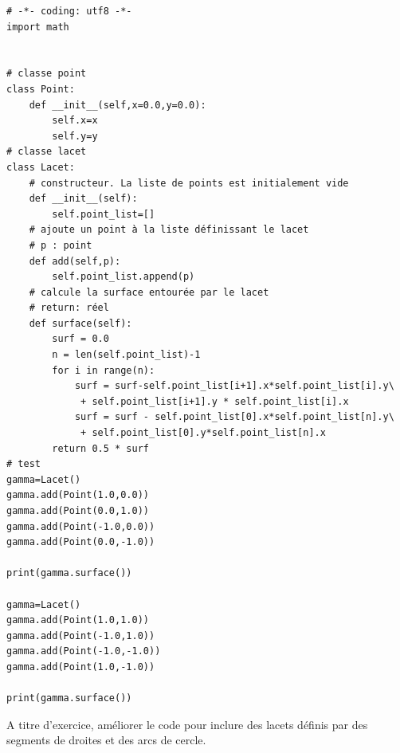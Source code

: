 \begin{verbatim}
# -*- coding: utf8 -*-
import math


# classe point
class Point:
    def __init__(self,x=0.0,y=0.0):
        self.x=x
        self.y=y
# classe lacet
class Lacet:
    # constructeur. La liste de points est initialement vide
    def __init__(self):
        self.point_list=[]
    # ajoute un point à la liste définissant le lacet
    # p : point
    def add(self,p):
        self.point_list.append(p)
    # calcule la surface entourée par le lacet
    # return: réel
    def surface(self):
        surf = 0.0
        n = len(self.point_list)-1
        for i in range(n):
            surf = surf-self.point_list[i+1].x*self.point_list[i].y\
             + self.point_list[i+1].y * self.point_list[i].x
        	surf = surf - self.point_list[0].x*self.point_list[n].y\
        	 + self.point_list[0].y*self.point_list[n].x
        return 0.5 * surf
# test
gamma=Lacet()
gamma.add(Point(1.0,0.0))
gamma.add(Point(0.0,1.0))
gamma.add(Point(-1.0,0.0))
gamma.add(Point(0.0,-1.0))

print(gamma.surface())

gamma=Lacet()
gamma.add(Point(1.0,1.0))
gamma.add(Point(-1.0,1.0))
gamma.add(Point(-1.0,-1.0))
gamma.add(Point(1.0,-1.0))

print(gamma.surface())
\end{verbatim}
A titre d'exercice, améliorer le code pour inclure des lacets définis par des segments de droites et des arcs de cercle. 
\newpage
\leftline{\textbf{Un peu d'histoire \dots}}
\vskip 12pt
